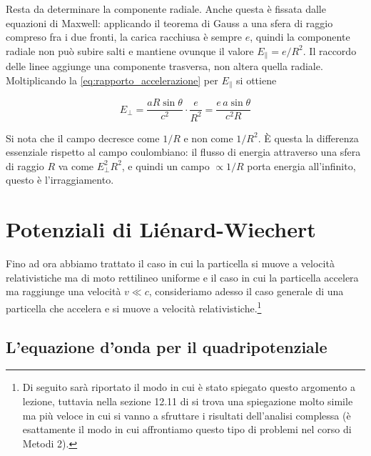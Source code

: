 Resta da determinare la componente radiale. Anche questa è fissata dalle equazioni di Maxwell: applicando il teorema di Gauss a una sfera di raggio compreso fra i due fronti, la carica racchiusa è sempre $e$, quindi la componente radiale non può subire salti e mantiene ovunque il valore $E_\parallel = e/R^2$. Il raccordo delle linee aggiunge una componente trasversa, non altera quella radiale. Moltiplicando la \eqref{eq:rapporto_accelerazione} per $E_\parallel$ si ottiene 
\begin{tcolorbox}[colback=black!5!white, colframe=black!45!white, boxrule=0.8pt]
\begin{equation}
    E_\perp = \frac{aR\sin\theta}{c^2}\cdot\frac{e}{R^2} = \frac{e\,a\sin\theta}{c^2 R}
    \label{eq:campo_radiazione}
\end{equation}
\end{tcolorbox}

Si nota che il campo decresce come $1/R$ e non come $1/R^2$. È questa la differenza essenziale rispetto al campo coulombiano: il flusso di energia attraverso una sfera di raggio $R$ va come $E_\perp^2 R^2$, e quindi un campo $\propto 1/R$ porta energia all'infinito, questo è l'irraggiamento.

\section{Potenziali di Liénard-Wiechert}
Fino ad ora abbiamo trattato il caso in cui la particella si muove a velocità relativistiche ma di moto rettilineo uniforme e il caso in cui la particella accelera ma raggiunge una velocità $v\ll c$, consideriamo adesso il caso generale di una particella che accelera e si muove a velocità relativistiche.\footnote{Di seguito sarà riportato il modo in cui è stato spiegato questo argomento a lezione, tuttavia nella sezione 12.11 di \cite{jackson} si trova una spiegazione molto simile ma più veloce in cui si vanno a sfruttare i risultati dell'analisi complessa (è esattamente il modo in cui affrontiamo questo tipo di problemi nel corso di Metodi 2).}\\

\subsection*{L'equazione d'onda per il quadripotenziale}

